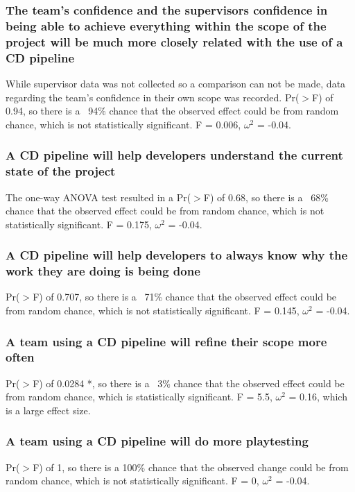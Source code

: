\documentclass[journal]{IEEEtran}
\begin{document}
        \subsubsection{The team's confidence and the supervisors confidence in being able to achieve everything within the scope of the project will be much more closely related with the use of a CD pipeline}
            While supervisor data was not collected so a comparison can not be made, data regarding the team's confidence in their own scope was recorded. Pr($>$F) of 0.94, so there is a ~94\% chance that the observed effect could be from random chance, which is not statistically significant. F = 0.006, $\omega^2$ = -0.04. \\

        \subsubsection{A CD pipeline will help developers understand the current state of the project}
            The one-way ANOVA test resulted in a Pr($>$F) of 0.68, so there is a ~68\% chance that the observed effect could be from random chance, which is not statistically significant. F = 0.175, $\omega^2$ = -0.04. \\

        \subsubsection{A CD pipeline will help developers to always know why the work they are doing is being done}
            Pr($>$F) of 0.707, so there is a ~71\% chance that the observed effect could be from random chance, which is not statistically significant. F = 0.145, $\omega^2$ = -0.04. \\

        \subsubsection{A team using a CD pipeline will refine their scope more often}
            Pr($>$F) of 0.0284 *, so there is a ~3\% chance that the observed effect could be from random chance, which is statistically significant. F = 5.5, $\omega^2$ = 0.16, which is a large effect size. \\

        \subsubsection{A team using a CD pipeline will do more playtesting}
            Pr($>$F) of 1, so there is a 100\% chance that the observed change could be from random chance, which is not statistically significant. F = 0, $\omega^2$ = -0.04. \\
\end{document}
